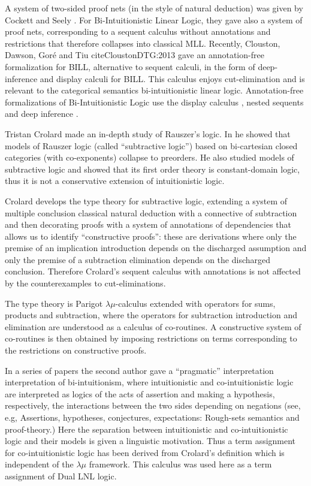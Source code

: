 A system of two-sided proof nets (in the style of natural deduction)
was given by Cockett and Seely \cite{Cockett:1997}.  For
Bi-Intuitionistic Linear Logic, they gave also a system of proof nets,
corresponding to a sequent calculus without annotations and
restrictions that therefore collapses into classical MLL.  Recently,
Clouston, Dawson, Goré and Tiu cite{CloustonDTG:2013} gave an 
annotation-free formalization for BILL, alternative to sequent calculi, 
in the form of deep-inference and display calculi for BILL. This calculus 
enjoys cut-elimination and is relevant to the categorical semantics
bi-intuitionistic linear logic. Annotation-free formalizations of 
Bi-Intuitionistic Logic use the display calculus \cite{Gore:2000}, nested sequents
\cite{GorePostnieceTiu:2008} and deep inference \cite{Postniece:2009}.
 

Tristan Crolard \cite{Crolard:2001,Crolard:2004} made an in-depth
study of Rauszer's logic. In \cite{Crolard:2001} he showed that models
of Rauszer logic (called ``subtractive logic'') based on bi-cartesian
closed categories (with co-exponents) collapse to preorders.  He also
studied models of subtractive logic and showed that its first order
theory is constant-domain logic, thus it is not a conservative
extension of intuitionistic logic.

Crolard \cite{Crolard:2004} develops the type theory for subtractive
logic, extending a system of multiple conclusion classical natural
deduction with a connective of subtraction and then decorating proofs
with a system of annotations of dependencies that allows us to
identify ``constructive proofs'': these are derivations where only the
premise of an implication introduction depends on the discharged
assumption and only the premise of a subtraction elimination depends
on the discharged conclusion. Therefore Crolard's sequent calculus
with annotations is not affected by the counterexamples to
cut-eliminations.

The type theory is Parigot $\lambda\mu$-calculus extended with
operators for sums, products and subtraction, where the operators for
subtraction introduction and elimination are understood as a calculus
of co-routines.  A constructive system of co-routines is then obtained
by imposing restrictions on terms corresponding to the restrictions on
constructive proofs.  

In a series of papers the second author gave a ``pragmatic''
interpretation interpretation of bi-intuitionism, where intuitionistic
and co-intuitionistic logic are interpreted as logics of the acts of
assertion and making a hypothesis, respectively, the interactions
between the two sides depending on negations (see, e.g,
\cite{Bellin:2014} Assertions, hypotheses, conjectures, expectations:
Rough-sets semantics and proof-theory.)  Here the separation between 
intuitionistic and co-intuitionistic logic and their models is given a 
linguistic motivation. Thus a term assignment for co-intuitionistic 
logic has been derived from Crolard's definition which is independent
of the $\lambda\mu$ framework. This calculus was used
here as a term assignment of Dual LNL logic.


